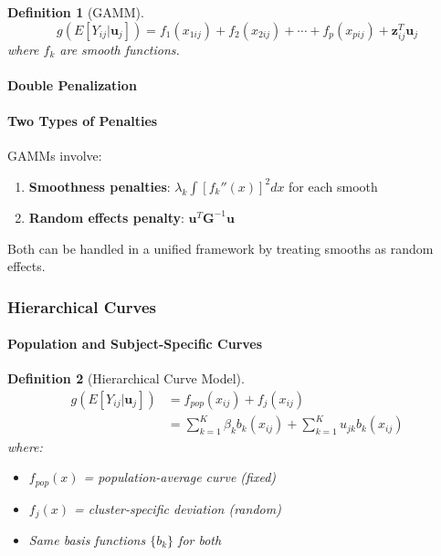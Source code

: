\documentclass{article}
\newtheorem{definition}{Definition}
\begin{document}
\begin{definition}[GAMM]
\begin{equation}
g(E[Y_{ij}|\mathbf{u}_j]) = f_1(x_{1ij}) + f_2(x_{2ij}) + \cdots + f_p(x_{pij}) + \mathbf{z}_{ij}^T\mathbf{u}_j
\end{equation}
where $f_k$ are smooth functions.
\end{definition}

\paragraph{Double Penalization}

\paragraph*{Two Types of Penalties}
GAMMs involve:
\begin{enumerate}
    \item \textbf{Smoothness penalties}: $\lambda_k \int [f_k''(x)]^2dx$ for each smooth
    \item \textbf{Random effects penalty}: $\mathbf{u}^T\mathbf{G}^{-1}\mathbf{u}$
\end{enumerate}
Both can be handled in a unified framework by treating smooths as random effects.


\subsubsection{Hierarchical Curves}

\paragraph{Population and Subject-Specific Curves}

\begin{definition}[Hierarchical Curve Model]
\begin{align}
g(E[Y_{ij}|\mathbf{u}_j]) &= f_{pop}(x_{ij}) + f_j(x_{ij}) \\
&= \sum_{k=1}^K \beta_k b_k(x_{ij}) + \sum_{k=1}^K u_{jk} b_k(x_{ij}) \nonumber
\end{align}
where:
\begin{itemize}
    \item $f_{pop}(x)$ = population-average curve (fixed)
    \item $f_j(x)$ = cluster-specific deviation (random)
    \item Same basis functions $\{b_k\}$ for both
\end{itemize}
\end{definition}
\end{document}
